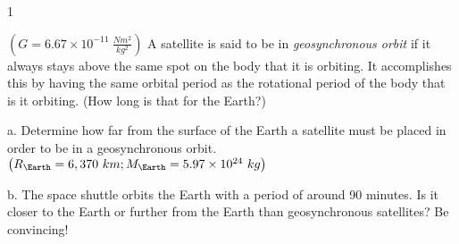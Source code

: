 
\AddToShipoutPicture*{\BackgroundPic}

\addtocounter {ProbNum} {1}

{\bf \Large{}} ${\left ( G = 6.67 \times 10^{-11}~\tfrac{Nm^2}{kg^2} \right )}$ A satellite is said to be in \emph{geosynchronous orbit} if it always stays above the same spot on the body that it is orbiting.  It accomplishes this by having the same orbital period as the rotational period of the body that is it orbiting. (How long is that for the Earth?)

\bigskip

a. Determine how far from the surface of the Earth a satellite must be placed in order to be in a geosynchronous orbit. ${\left ( R_{\Earth} = 6,370~km; M_{\Earth}=5.97 \times 10^{24}~kg \right )}$

\vfill

b. The space shuttle orbits the Earth with a period of around 90 minutes.  Is it closer to the Earth or further from the Earth than geosynchronous satellites?  Be convincing!

\vspace{25mm}
 
\newpage
